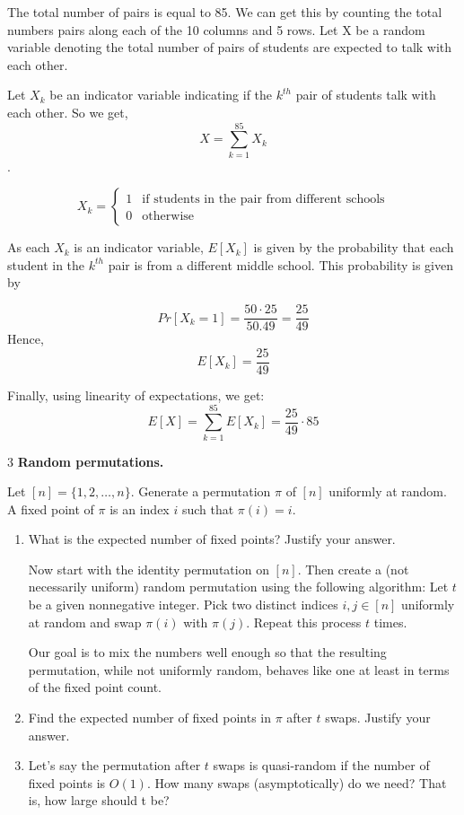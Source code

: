 \documentclass[12pt]{article}
\begin{document}
\begin{solution}
        \bbni 
        
        The total number of pairs is equal to 85. We can get this by counting the total numbers pairs along each of the 10 columns and 5 rows. Let X be a random variable denoting the total number of pairs of students are expected to talk with each other. 

        Let $X_k$ be an indicator variable indicating if the $k^{th}$ pair of students talk with each other. So we get, \[X = \sum_{k=1}^{85} X_k\]. 
        
         \[X_k = \begin{cases*}
            1 & \text{if students in the pair from different schools} \\ 
            0 & \text{otherwise}
        \end{cases*}\]

        
        As each $X_k$ is an indicator variable, $E[X_k]$  is given by the probability that each student in the $k^{th}$ pair is from a different middle school. This probability is given by

        \[Pr[X_k=1] = \frac{50 \cdot25}{50.49}  = \frac{25}{49}\]
        Hence, \[E[X_k] = \frac{25}{49}\]

        
        Finally, using linearity of expectations, we get: 
        \[E[X] = \sum_{k=1}^{85}E[X_k] = \frac{25}{49} \cdot85\]
\end{solution}

\newpage 

\begin{problem}{3}
    \textbf{Random permutations.} 
    
    Let $[n] = \{1,2,\dots,n\}$. Generate a permutation $\pi$ of $[n]$ uniformly at random. A fixed point of $\pi$ is an index $i$ such that $\pi(i)=i$.

    \begin{enumerate}
        \item[(a)] What is the expected number of fixed points? Justify your answer.

        Now start with the identity permutation on $[n]$. Then create a (not necessarily uniform) random permutation using the following algorithm: Let $t$ be a given nonnegative integer. Pick two distinct indices $i,j \in [n]$ uniformly at random and swap $\pi(i)$ with $\pi(j)$. Repeat this process $t$ times.
        
        Our goal is to mix the numbers well enough so that the resulting permutation, while not uniformly random, behaves like one at least in terms of the fixed point count.

        \item[(b)] Find the expected number of fixed points in $\pi$ after $t$ swaps. Justify your answer.

        \item[(c)] Let's say the permutation after $t$ swaps is quasi-random if the number of fixed points is $O(1)$.  How many swaps (asymptotically) do we need? That is, how large should t be?
    \end{enumerate}
\end{problem}
\end{document}
